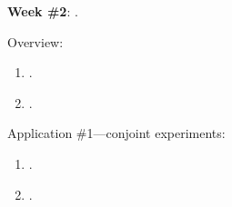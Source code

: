 \documentclass[letterpaper]{article}
\renewenvironment{itemize}{
  \begin{list}{}{
    \setlength{\leftmargin}{1.5em}
  }
}{
  \end{list}
}
\begin{document}
\begin{enumerate}
\begin{itemize}
      \end{itemize}



	\item {\bf Week \#2}: {\color{ForestGreen}{\bf Survey Experiments: Conjoint and List Designs}}.

			\begin{itemize} 

        \item[$\diamond$] Overview:

        \begin{enumerate}

          \item[$\bullet$] \href{https://www.cambridge.org/core/product/identifier/S1047198700006343/type/journal_article}{}.

          \item[$\bullet$] \href{https://www.cambridge.org/core/product/identifier/S2052263015000196/type/journal_article}{}.

        \end{enumerate}

       \item[$\diamond$] Application \#1---conjoint experiments:

           \begin{enumerate}


           \item[$\bullet$] \href{https://www.cambridge.org/core/product/identifier/S1047198700013589/type/journal_article}{}.


           \item[$\bullet$] \href{https://doi.org/10.1017/pan.2019.30}{}.

        

         \end{enumerate}


\end{itemize}
\end{enumerate}
\end{document}
